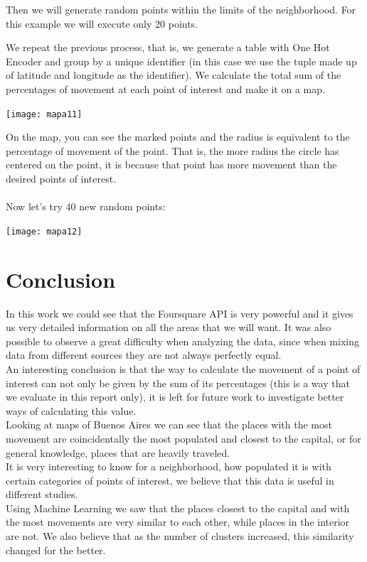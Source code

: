 \documentclass[12pt,a4paper]{tesis}
\begin{document}
Then we will generate random points within the limits of the neighborhood. For this example we will execute only 20 points.

We repeat the previous process, that is, we generate a table with One Hot Encoder and group by a unique identifier (in this case we use the tuple made up of latitude and longitude as the identifier). We calculate the total sum of the percentages of movement at each point of interest and make it on a map.

\centerline{
	\texttt{[image: mapa11]}
}

On the map, you can see the marked points and the radius is equivalent to the percentage of movement of the point. That is, the more radius the circle has centered on the point, it is because that point has more movement than the desired points of interest. \\ \\

Now let's try 40 new random points: \\

\centerline{
	\texttt{[image: mapa12]}
}

\chapter{Conclusion}
In this work we could see that the Foursquare API is very powerful and it gives us very detailed information on all the areas that we will want. It was also possible to observe a great difficulty when analyzing the data, since when mixing data from different sources they are not always perfectly equal. \\
An interesting conclusion is that the way to calculate the movement of a point of interest can not only be given by the sum of its percentages (this is a way that we evaluate in this report only), it is left for future work to investigate better ways of calculating this value. \\
Looking at maps of Buenos Aires we can see that the places with the most movement are coincidentally the most populated and closest to the capital, or for general knowledge, places that are heavily traveled. \\
It is very interesting to know for a neighborhood, how populated it is with certain categories of points of interest, we believe that this data is useful in different studies. \\
Using Machine Learning we saw that the places closest to the capital and with the most movements are very similar to each other, while places in the interior are not. We also believe that as the number of clusters increased, this similarity changed for the better. \\
\end{document}
